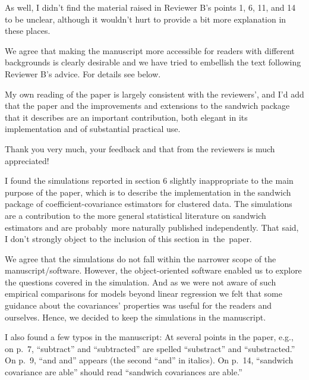 \documentclass[american,foldmarks=false]{uibklttr}
\newenvironment{review}{\fontshape{\itdefault}\fontseries{\bfdefault} \selectfont \smallskip}{\par}
\begin{document}
\begin{review}
As well, I didn't find the material raised in Reviewer B's points 1, 6, 11, and
14 to be unclear, although it wouldn't hurt to provide a bit more explanation in
these places.
\end{review}

We agree that making the manuscript more accessible for readers with different
backgrounds is clearly desirable and we have tried to embellish the text
following Reviewer B's advice. For details see below.


\begin{review}
My own reading of the paper is largely consistent with the
reviewers', and I'd add that the paper and the improvements and extensions to
the sandwich package that it describes are an important contribution, both
elegant in its implementation and of substantial practical use.
\end{review}

Thank you very much, your feedback and that from the reviewers is much
appreciated!


\begin{review}
I found the simulations reported in section 6 slightly
inappropriate to the main purpose of the paper, which is to describe the
implementation in the sandwich package of coefficient-covariance estimators for
clustered data.  The simulations are a contribution to the more general
statistical literature on sandwich estimators and are probably~more naturally
published independently.  That said, I don't strongly object to the inclusion of
this section in~the~paper.
\end{review}

We agree that the simulations do not fall within the narrower scope of the
manuscript/software. However, the object-oriented software enabled us to explore
the questions covered in the simulation. And as we were not aware of such
empirical comparisons for models beyond linear regression we felt that some
guidance about the covariances' properties was useful for the readers and
ourselves. Hence, we decided to keep the simulations in the manuscript.


\begin{review}
I also found a few typos in the manuscript: At several points in
the paper, e.g., on p.~7, ``subtract'' and ``subtracted'' are spelled
``substract'' and ``substracted.'' On p.~9, ``and and'' appears (the second
``and'' in italics).  On p.~14, ``sandwich covariance are able'' should read
``sandwich covariances are able.''
\end{review}
\end{document}
